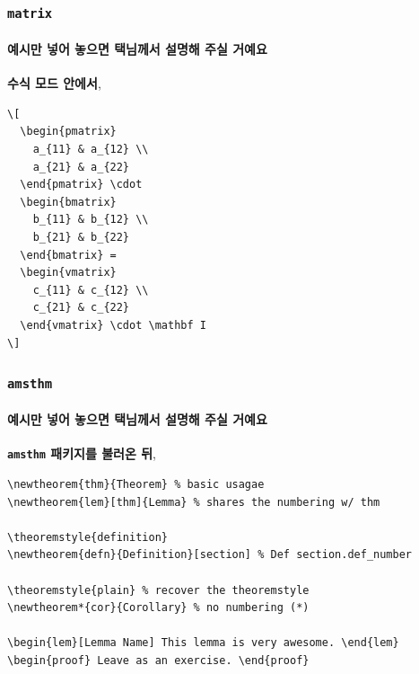 \begin{frame}[fragile]
  \frametitle{\texttt{matrix}}
  \framesubtitle{예시만 넣어 놓으면 택님께서 설명해 주실 거예요}
  \textbf{수식 모드 안에서}, \vspace{-1em}
  \begin{verbatim}
\[ 
  \begin{pmatrix}
    a_{11} & a_{12} \\  
    a_{21} & a_{22}
  \end{pmatrix} \cdot
  \begin{bmatrix}
    b_{11} & b_{12} \\  
    b_{21} & b_{22}
  \end{bmatrix} =
  \begin{vmatrix}
    c_{11} & c_{12} \\  
    c_{21} & c_{22}
  \end{vmatrix} \cdot \mathbf I
\]
  \end{verbatim}
\end{frame}

\begin{frame}[fragile]
  \frametitle{\texttt{amsthm}}
  \framesubtitle{예시만 넣어 놓으면 택님께서 설명해 주실 거예요}
  \textbf{\texttt{amsthm} 패키지를 불러온 뒤},\vspace{-1em}
  \begin{verbatim}
\newtheorem{thm}{Theorem} % basic usagae
\newtheorem{lem}[thm]{Lemma} % shares the numbering w/ thm

\theoremstyle{definition}
\newtheorem{defn}{Definition}[section] % Def section.def_number

\theoremstyle{plain} % recover the theoremstyle
\newtheorem*{cor}{Corollary} % no numbering (*)

\begin{lem}[Lemma Name] This lemma is very awesome. \end{lem}
\begin{proof} Leave as an exercise. \end{proof}
  \end{verbatim}
\end{frame}

